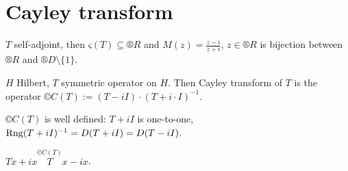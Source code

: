 \documentclass[12pt]{article}					%
\begin{document}
\section{Cayley transform}
\begin{poznamka}[Motivation]
	$T$ self-adjoint, then $ς(T) \subseteq ®R$ and $M(z) = \frac{z - i}{z + i}$, $z \in ®R$ is bijection between $®R$ and $®D \setminus \{1\}$.
\end{poznamka}

\begin{definice}
	$H$ Hilbert, $T$ symmetric operator on $H$. Then Cayley transform of $T$ is the operator $©C(T) := (T - iI)·(T + i·I)^{-1}$.

	\begin{poznamkain}
		$©C(T)$ is well defined: $T + iI$ is one-to-one, $\operatorname{Rng}(T + iI)^{-1} = D(T + iI) = D(T - iI)$.

		$Tx + ix \overset{©C(T)} Tx - ix$.
	\end{poznamkain}
\end{definice}
\end{document}
